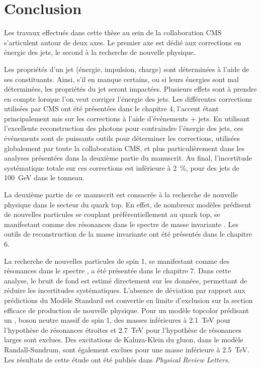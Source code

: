 \chapter*{Conclusion}


Les travaux effectués dans cette thèse au sein de la collaboration CMS s'articulent autour de deux axes. Le premier axe est dédié aux corrections en énergie des jets, le second à la recherche de nouvelle physique.

\medskip

Les propriétés d'un jet (énergie, impulsion, charge) sont déterminées à l'aide de ses constituants. Ainsi, s'il en manque certains, ou si leurs énergies sont mal déterminées, les propriétés du jet seront impactées. Plusieurs effets sont à prendre en compte lorsque l'on veut corriger l'énergie des jets. Les différentes corrections utilisées par CMS ont été présentées dans le chapitre 4, l'accent étant principalement mis sur les corrections à l'aide d'événements \Pgamma + jets. En utilisant l'excellente reconstruction des photons pour contraindre l'énergie des jets, ces événements sont de puissants outils pour déterminer les corrections, utilisées globalement par toute la collaboration CMS, et plus particulièrement dans les analyses présentées dans la deuxième partie du manuscrit. Au final, l'incertitude systématique totale sur ces corrections est inférieure à \SI{2}{\%}, pour des jets de \SI{100}{\GeV} dans le tonneau.

\bigskip

La deuxième partie de ce manuscrit est consacrée à la recherche de nouvelle physique dans le secteur du quark top. En effet, de nombreux modèles prédisent de nouvelles particules se couplant préférentiellement au quark top, se manifestant comme des résonances dans le spectre de masse invariante \ttbar. Les outils de reconstruction de la masse invariante ont été présentés dans le chapitre 6.

\smallskip

La recherche de nouvelles particules de spin 1, se manifestant comme des résonances dans le spectre \mtt, a été présentée dans le chapitre 7. Dans cette analyse, le bruit de fond est estimé directement sur les données, permettant de réduire les incertitudes systématiques. L'absence de déviation par rapport aux prédictions du Modèle Standard est convertie en limite d'exclusion sur la section efficace de production de nouvelle physique. Pour un modèle topcolor prédisant un \zprime, boson neutre massif de spin 1, des masses inférieures à \SI{2.1}{\TeV} pour l'hypothèse de résonances étroites et \SI{2.7}{\TeV} pour l'hypothèse de résonances larges sont exclues. Des excitations de Kaluza-Klein du gluon, dans le modèle Randall-Sundrum, sont également exclues pour une masse inférieure à \SI{2.5}{\TeV}. Les résultats de cette étude ont été publiés dans \emph{Physical Review Letters}.

